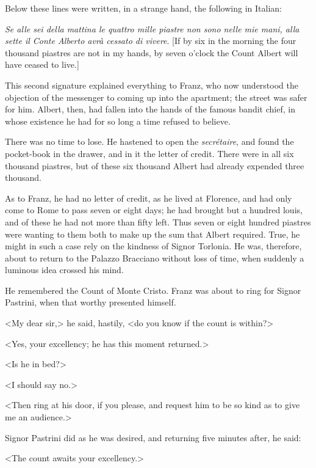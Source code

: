  Below these lines were written, in a strange hand, the following in Italian: 

\begin{mail}{}{}
 \textit{Se alle sei della mattina le quattro mille piastre non sono nelle mie mani, alla sette il Conte Alberto avrà cessato di vivere}. [If by six in the morning the four thousand piastres are not in my hands, by seven o'clock the Count Albert will have ceased to live.]

\end{mail}

 This second signature explained everything to Franz, who now understood the objection of the messenger to coming up into the apartment; the street was safer for him. Albert, then, had fallen into the hands of the famous bandit chief, in whose existence he had for so long a time refused to believe. 

 There was no time to lose. He hastened to open the \textit{secrétaire}, and found the pocket-book in the drawer, and in it the letter of credit. There were in all six thousand piastres, but of these six thousand Albert had already expended three thousand. 

 As to Franz, he had no letter of credit, as he lived at Florence, and had only come to Rome to pass seven or eight days; he had brought but a hundred louis, and of these he had not more than fifty left. Thus seven or eight hundred piastres were wanting to them both to make up the sum that Albert required. True, he might in such a case rely on the kindness of Signor Torlonia. He was, therefore, about to return to the Palazzo Bracciano without loss of time, when suddenly a luminous idea crossed his mind. 

 He remembered the Count of Monte Cristo. Franz was about to ring for Signor Pastrini, when that worthy presented himself. 

 <My dear sir,> he said, hastily, <do you know if the count is within?> 

 <Yes, your excellency; he has this moment returned.> 

 <Is he in bed?> 

 <I should say no.> 

 <Then ring at his door, if you please, and request him to be so kind as to give me an audience.> 

 Signor Pastrini did as he was desired, and returning five minutes after, he said: 

 <The count awaits your excellency.> 

